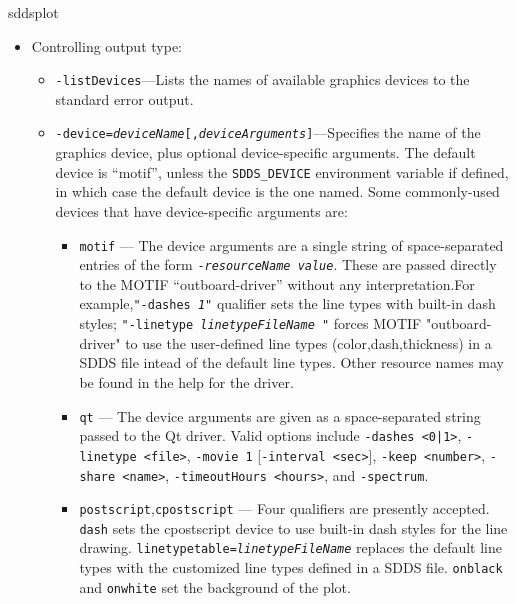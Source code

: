 \begin{sddsprog}{sddsplot}
\begin{itemize}
\begin{itemize}
  \item {\tt -namescan=\{all | first\}} --- Specifies whether \verb|sddsplot| should scan all input files when searching
        for matches to wildcard datanames, or only the first.  The default is to scan all files, which may be slow
        for many files with large numbers of columns or parameters.
  \end{itemize}
   
\item Controlling output type:
  \begin{itemize}
  \item {\tt -listDevices}---Lists the names of available graphics devices to the standard error output.
  \item {\tt -device={\em deviceName}[,{\em deviceArguments}]}---Specifies the name of the graphics
        device, plus optional device-specific arguments.  The default device is ``motif'', unless the
        {\tt SDDS\_DEVICE} environment variable if defined, in which case the default device is the one
        named.
        Some commonly-used devices that have device-specific arguments are:
        \begin{itemize} 
        \item {\tt motif} --- The device arguments are a single string of space-separated entries of the
        form {\tt -{\em resourceName} {\em value}}.  These are passed directly to the MOTIF ``outboard-driver''
        without any interpretation.For example,{\tt "-dashes {\em 1}"} qualifier sets the line types with
        built-in dash styles; {\tt "-linetype {\em linetypeFileName }"} forces MOTIF "outboard-driver" to use
        the user-defined line types (color,dash,thickness)  in a SDDS file intead of the default line types.
        Other resource names may be found in the help for the driver.
        \item {\tt qt} --- The device arguments are given as a space-separated string passed to the Qt
        driver.  Valid options include {\tt -dashes <0|1>}, {\tt -linetype <file>}, {\tt -movie 1}
        [{\tt -interval <sec>}], {\tt -keep <number>}, {\tt -share <name>}, {\tt -timeoutHours <hours>}, and
        {\tt -spectrum}.
        \item {\tt postscript},{\tt cpostscript} --- Four qualifiers are presently accepted. {\tt dash} sets
        the cpostscript device to use built-in dash styles for the line drawing.
        {\tt linetypetable={\em linetypeFileName}} replaces the default line types with the customized line types
        defined in a SDDS file. {\tt onblack} and {\tt onwhite} set the background of the plot.

\end{itemize}
\end{itemize}
\end{itemize}
\end{sddsprog}
